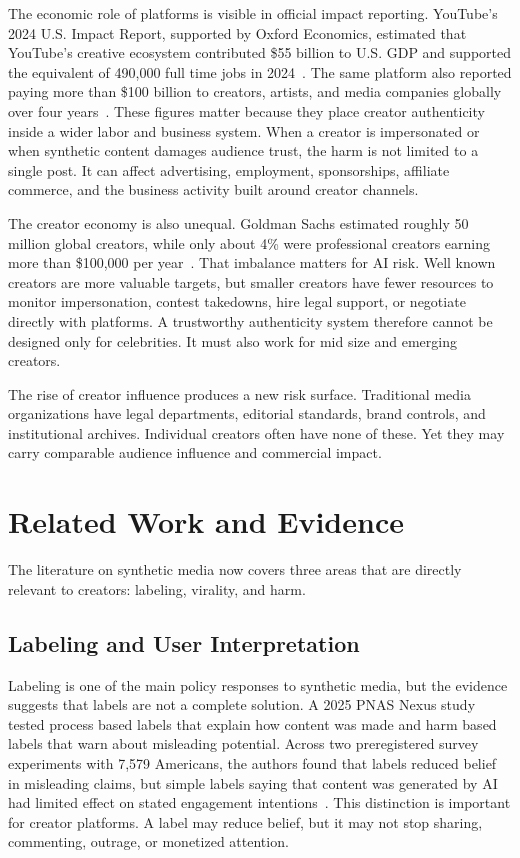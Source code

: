 \documentclass[11pt]{article}
\begin{document}
The economic role of platforms is visible in official impact reporting. YouTube's 2024 U.S. Impact Report, supported by Oxford Economics, estimated that YouTube's creative ecosystem contributed \$55 billion to U.S. GDP and supported the equivalent of 490,000 full time jobs in 2024~\cite{youtube2024impact}. The same platform also reported paying more than \$100 billion to creators, artists, and media companies globally over four years~\cite{youtube2025made}. These figures matter because they place creator authenticity inside a wider labor and business system. When a creator is impersonated or when synthetic content damages audience trust, the harm is not limited to a single post. It can affect advertising, employment, sponsorships, affiliate commerce, and the business activity built around creator channels.

The creator economy is also unequal. Goldman Sachs estimated roughly 50 million global creators, while only about 4\% were professional creators earning more than \$100,000 per year~\cite{goldman2023creator}. That imbalance matters for AI risk. Well known creators are more valuable targets, but smaller creators have fewer resources to monitor impersonation, contest takedowns, hire legal support, or negotiate directly with platforms. A trustworthy authenticity system therefore cannot be designed only for celebrities. It must also work for mid size and emerging creators.

The rise of creator influence produces a new risk surface. Traditional media organizations have legal departments, editorial standards, brand controls, and institutional archives. Individual creators often have none of these. Yet they may carry comparable audience influence and commercial impact.

\section{Related Work and Evidence}

The literature on synthetic media now covers three areas that are directly relevant to creators: labeling, virality, and harm.

\subsection{Labeling and User Interpretation}

Labeling is one of the main policy responses to synthetic media, but the evidence suggests that labels are not a complete solution. A 2025 PNAS Nexus study tested process based labels that explain how content was made and harm based labels that warn about misleading potential. Across two preregistered survey experiments with 7,579 Americans, the authors found that labels reduced belief in misleading claims, but simple labels saying that content was generated by AI had limited effect on stated engagement intentions~\cite{wittenberg2025labeling}. This distinction is important for creator platforms. A label may reduce belief, but it may not stop sharing, commenting, outrage, or monetized attention.
\end{document}
